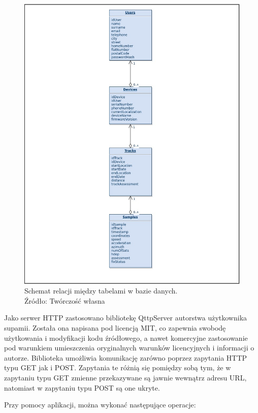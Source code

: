\begin{figure}[H]
	\centering
	\includegraphics[width=17cm]{img/software/database/Database_relations.jpg}
	\caption{Schemat relacji między tabelami w bazie danych. 
	\\Źródło: Twórczość własna}
	\label{fig:image_soft_db_relations}
\end{figure}

Jako serwer HTTP zastosowano bibliotekę QttpServer autorstwa użytkownika supamii\cite{qttpserver}. Została ona napisana pod licencją MIT, co zapewnia swobodę użytkowania i modyfikacji kodu źródłowego, a nawet komercyjne zastosowanie pod warunkiem umieszczenia oryginalnych warunków licencyjnych i informacji o autorze. Biblioteka umożliwia komunikację zarówno poprzez zapytania HTTP typu GET jak i POST. Zapytania te różnią się pomiędzy sobą tym, że w zapytaniu typu GET zmienne przekazywane są jawnie wewnątrz adresu URL, natomiast w zapytaniu typu POST są one ukryte.

Przy pomocy aplikacji, można wykonać następujące operacje:

